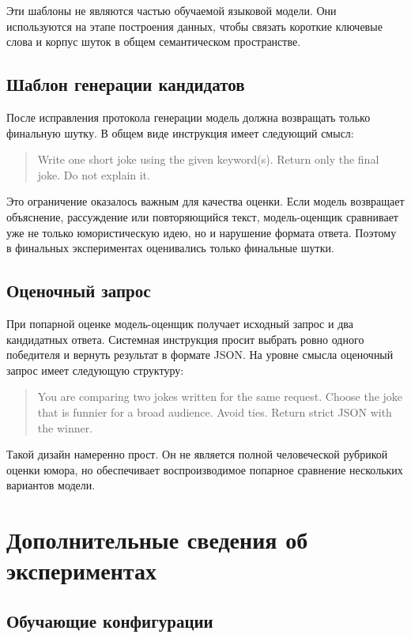 Эти шаблоны не являются частью обучаемой языковой модели. Они используются на этапе построения данных, чтобы связать короткие ключевые слова и корпус шуток в общем семантическом пространстве.

\section{Шаблон генерации кандидатов}

После исправления протокола генерации модель должна возвращать только финальную шутку. В общем виде инструкция имеет следующий смысл:
\begin{quote}
    \ttfamily Write one short joke using the given keyword(s). Return only the final joke. Do not explain it.
\end{quote}

Это ограничение оказалось важным для качества оценки. Если модель возвращает объяснение, рассуждение или повторяющийся текст, модель-оценщик сравнивает уже не только юмористическую идею, но и нарушение формата ответа. Поэтому в финальных экспериментах оценивались только финальные шутки.

\section{Оценочный запрос}

При попарной оценке модель-оценщик получает исходный запрос и два кандидатных ответа. Системная инструкция просит выбрать ровно одного победителя и вернуть результат в формате JSON. На уровне смысла оценочный запрос имеет следующую структуру:
\begin{quote}
    \ttfamily You are comparing two jokes written for the same request. Choose the joke that is funnier for a broad audience. Avoid ties. Return strict JSON with the winner.
\end{quote}

Такой дизайн намеренно прост. Он не является полной человеческой рубрикой оценки юмора, но обеспечивает воспроизводимое попарное сравнение нескольких вариантов модели.

\chapter{Дополнительные сведения об экспериментах}

\section{Обучающие конфигурации}

